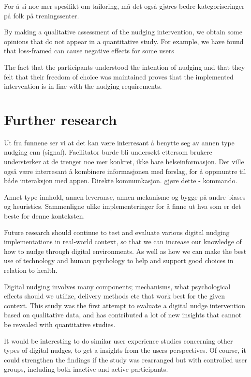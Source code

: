 For å si noe mer spesifikt om tailoring, må det også gjøres bedre kategoriseringer på folk på treningssenter. 

By making a qualitative assessment of the nudging intervention, we obtain some opinions that do not appear in a quantitative study. For example, we have found that loss-framed can cause negative effects for some users

The fact that the participants understood the intention of nudging and that they felt that their freedom of choice was maintained proves that the implemented intervention is in line with the nudging requirements.

\section{Further research}
Ut fra funnene ser vi at det kan være interresant å benytte seg av annen type nudging enn (signal). Facilitator burde bli undersøkt ettersom brukere understerker at de trenger noe mer konkret, ikke bare helseinformasjon. 
Det ville også være interresant å kombinere informasjonen med forslag, for å oppmuntre til både interaksjon med appen. Direkte kommunkasjon. gjøre dette - kommando. 

Annet type innhold, annen leveranse, annen mekanisme og bygge på andre biases og heuristics. 
Sammenligne ulike implementeringer for å finne ut hva som er det beste for denne konteksten. 

Future research should continue to test and evaluate various digital nudging implementations in real-world context, so that we can increase our knowledge of how to nudge through digital environments. As well as how we can make the best use of technology and human psychology to help and support good choices in relation to health. 

Digital nudging involves many components; mechanisms, what psychological effects should we utilize, delivery methods etc that work best for the given context. This study was the first attempt to evaluate a digital nudge intervention based on qualitative data, and has contributed a lot of new insights that cannot be revealed with quantitative studies.

It would be interesting to do similar user experience studies concerning other types of digital nudges, to get a insights from the users perspectives. Of course, it could strengthen the findings if the study was rearranged but with controlled user groups, including both inactive and active participants.   

